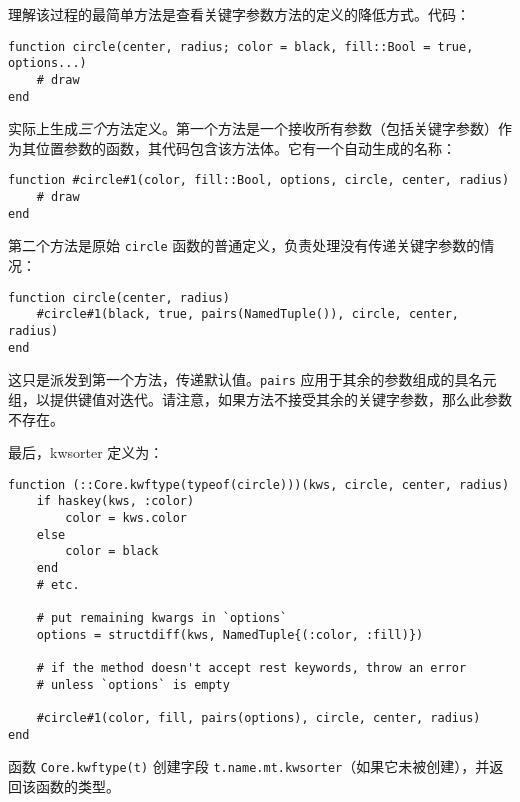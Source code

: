 理解该过程的最简单方法是查看关键字参数方法的定义的降低方式。代码：




\begin{verbatim}
function circle(center, radius; color = black, fill::Bool = true, options...)
    # draw
end
\end{verbatim}



实际上生成\emph{三个}方法定义。第一个方法是一个接收所有参数（包括关键字参数）作为其位置参数的函数，其代码包含该方法体。它有一个自动生成的名称：




\begin{verbatim}
function #circle#1(color, fill::Bool, options, circle, center, radius)
    # draw
end
\end{verbatim}



第二个方法是原始 \texttt{circle} 函数的普通定义，负责处理没有传递关键字参数的情况：




\begin{verbatim}
function circle(center, radius)
    #circle#1(black, true, pairs(NamedTuple()), circle, center, radius)
end
\end{verbatim}



这只是派发到第一个方法，传递默认值。\texttt{pairs} 应用于其余的参数组成的具名元组，以提供键值对迭代。请注意，如果方法不接受其余的关键字参数，那么此参数不存在。



最后，kwsorter 定义为：




\begin{lstlisting}
function (::Core.kwftype(typeof(circle)))(kws, circle, center, radius)
    if haskey(kws, :color)
        color = kws.color
    else
        color = black
    end
    # etc.

    # put remaining kwargs in `options`
    options = structdiff(kws, NamedTuple{(:color, :fill)})

    # if the method doesn't accept rest keywords, throw an error
    # unless `options` is empty

    #circle#1(color, fill, pairs(options), circle, center, radius)
end
\end{lstlisting}



函数 \texttt{Core.kwftype(t)} 创建字段 \texttt{t.name.mt.kwsorter}（如果它未被创建），并返回该函数的类型。




